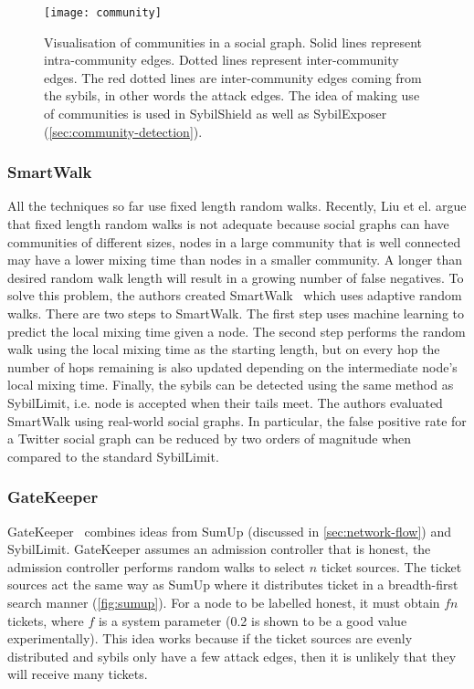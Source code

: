 \begin{figure}
  \centering
  \texttt{[image: community]}
  \caption{Visualisation of communities in a social graph. Solid lines represent
    intra-community edges. Dotted lines represent inter-community edges. The red
    dotted lines are inter-community edges coming from the sybils, in other
    words the attack edges. The idea of making use of communities is used in
    SybilShield as well as SybilExposer
    (\autoref{sec:community-detection}).}
  \label{fig:community}
\end{figure}

\subsubsection{SmartWalk}
All the techniques so far use fixed length random walks. Recently, Liu et el.
argue that fixed length random walks is not adequate because social graphs can
have communities of different sizes, nodes in a large community that is well
connected may have a lower mixing time than nodes in a smaller community. A
longer than desired random walk length will result in a growing number of false
negatives. To solve this problem, the authors created
SmartWalk~\cite{liu2016smartwalk} which uses adaptive random walks. There are two
steps to SmartWalk. The first step uses machine learning to predict the local
mixing time given a node. The second step performs the random walk using the
local mixing time as the starting length, but on every hop the number of hops
remaining is also updated depending on the intermediate node's local mixing
time. Finally, the sybils can be detected using the same method as SybilLimit,
i.e. node is accepted when their tails meet. The authors evaluated SmartWalk
using real-world social graphs. In particular, the false positive rate for a
Twitter social graph can be reduced by two orders of magnitude when compared to
the standard SybilLimit.

\subsubsection{GateKeeper}
GateKeeper~\cite{tran2011optimal} combines ideas from SumUp (discussed in
\autoref{sec:network-flow}) and SybilLimit. GateKeeper assumes an admission
controller that is honest, the admission controller performs random walks to
select $n$ ticket sources. The ticket sources act the same way as SumUp where it
distributes ticket in a breadth-first search manner (\autoref{fig:sumup}). For a
node to be labelled honest, it must obtain $fn$ tickets, where $f$ is a system
parameter (0.2 is shown to be a good value experimentally). This idea works
because if the ticket sources are evenly distributed and sybils only have a few
attack edges, then it is unlikely that they will receive many 
tickets.


